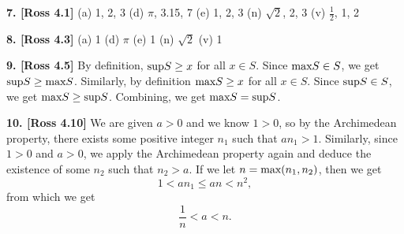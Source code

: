 \textbf{7. [Ross 4.1]} (a) 1, 2, 3
(d) $\pi$, 3.15, 7
(e) 1, 2, 3
(n) $\sqrt{2}$, 2, 3
(v) $\frac{1}{2}$, 1, 2

\textbf{8. [Ross 4.3]} (a) 1
(d) $\pi$
(e) 1
(n) $\sqrt{2}$
(v) 1

\textbf{9. [Ross 4.5]} By definition, $\text{sup}S \geq x$ for all $x \in S$. Since $\text{max}S \in S$, we get $\text{sup}S \geq \text{max}S$. Similarly, by definition $\text{max}S \geq x$ for all $x \in S$. Since $\text{sup}S \in S$, we get $\text{max}S \geq \text{sup}S$. Combining, we get $\text{max}S = \text{sup}S$. 

\textbf{10. [Ross 4.10]} We are given $a > 0$ and we know $1 > 0$, so by the Archimedean property, there exists some positive integer $n_1$ such that $an_1 > 1$. Similarly, since $1 > 0$ and $a > 0$, we apply the Archimedean property again and deduce the existence of some $n_2$ such that $n_2 > a$. If we let $n = \text{max}(n_1, n_2)$, then we get
\[
    1 < an_1 \leq an < n^2,
\]
from which we get
\[
    \frac{1}{n} < a < n.
\]






